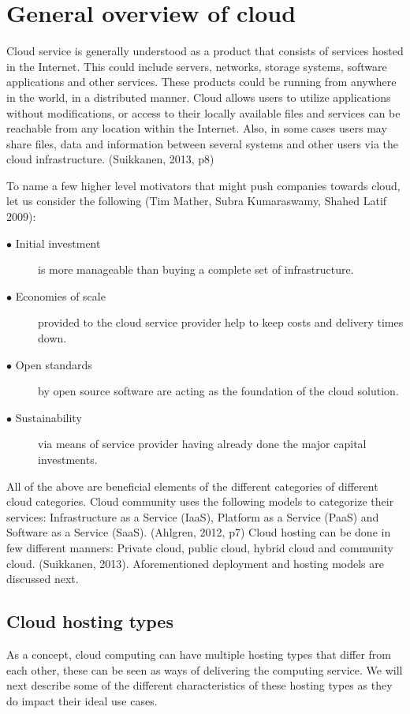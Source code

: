 \documentclass{article}
\begin{document}
\section{General overview of cloud}
Cloud service is generally understood as a product that consists of services hosted in the Internet. This could include servers, networks, storage systems, software applications and other services. These products could be running from anywhere in the world, in a distributed manner. Cloud allows users to utilize applications without modifications, or access to their locally available files and services can be reachable from any location within the Internet. Also, in some cases users may share files, data and information between several systems and other users via the cloud infrastructure.
(Suikkanen, 2013, p8)
\par
To name a few higher level motivators that might push companies towards cloud, let us consider the following (Tim Mather, Subra Kumaraswamy, Shahed Latif 2009):
\begin{description}
        \item[$\bullet$ Initial investment] is more manageable than buying a complete set of infrastructure.
        \item[$\bullet$ Economies of scale] provided to the cloud service provider help to keep costs and delivery times down.
        \item[$\bullet$ Open standards] by open source software are acting as the foundation of the cloud solution.
        \item[$\bullet$ Sustainability] via means of service provider having already done the major capital investments.
\end{description}
All of the above are beneficial elements of the different categories of different cloud categories.
Cloud community uses the following models to categorize their services: Infrastructure as a Service (IaaS), Platform as a Service (PaaS) and Software as a Service (SaaS). (Ahlgren, 2012, p7)
Cloud hosting can be done in few different manners: Private cloud, public cloud, hybrid cloud and community cloud. (Suikkanen, 2013).
Aforementioned deployment and hosting models are discussed next.
\subsection{Cloud hosting types}
As a concept, cloud computing can have multiple hosting types that differ from each other, these can be seen as ways of delivering the computing service. We will next describe some of the different characteristics of these hosting types as they do impact their ideal use cases.
\end{document}
